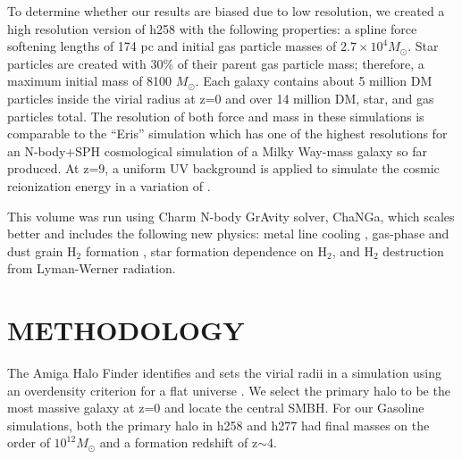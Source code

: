 \documentclass[12pt,headA,chapB]{fiskthesis}
\begin{document}
To determine whether our results are biased due to low resolution, we created a high resolution version of h258 with the following properties: a spline force softening lengths of 174 pc and initial gas particle masses of $2.7 \times 10^4 M_{\odot}$. Star particles are created with 30\% of their parent gas particle mass; therefore, a maximum initial mass of 8100 $M_{\odot}$. Each galaxy contains about 5 million DM particles inside the virial radius at z=0 and over 14 million DM, star, and gas particles total. The resolution of both force and mass in these simulations is comparable to the ``Eris'' simulation which has one of the highest resolutions for an N-body+SPH cosmological simulation of a Milky Way-mass galaxy so far produced.  At z=9, a uniform UV background is applied to simulate the cosmic reionization energy in a variation of \cite{Haardt2012}.

This volume was run using Charm N-body GrAvity solver, ChaNGa, which scales better and includes the following new physics: metal line cooling \citep{Christensen2012,Shen2010}, gas-phase and dust grain H$_2$ formation \citep{Christensen2014}, star formation dependence on H$_2$, and H$_2$ destruction from Lyman-Werner radiation. 



\chapter{\normalsize METHODOLOGY}
\thispagestyle{empty}

The Amiga Halo Finder identifies and sets the virial radii in a simulation using an overdensity criterion for a flat universe \citep{Knebe2001,Knollmann2009,Gill2004}. We select the primary halo to be the most massive galaxy at z=0 and locate the central SMBH. For our Gasoline simulations, both the primary halo in h258 and h277 had final masses on the order of $10^{12} M_{\odot}$ and a formation redshift of z$\sim$4.  

\end{document}
